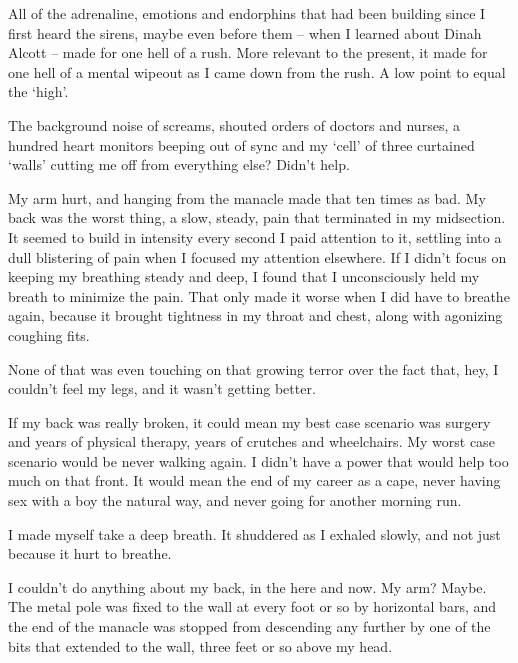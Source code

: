 All of the adrenaline, emotions and endorphins that had been building since I first heard the sirens, maybe even before them – when I learned about Dinah Alcott – made for one hell of a rush.  More relevant to the present, it made for one hell of a mental wipeout as I came down from the rush.  A low point to equal the `high'.



The background noise of screams, shouted orders of doctors and nurses, a hundred heart monitors beeping out of sync and my `cell' of three curtained `walls' cutting me off from everything else?   Didn't help.



My arm hurt, and hanging from the manacle made that ten times as bad.  My back was the worst thing, a slow, steady, pain that terminated in my midsection. It seemed to build in intensity every second I paid attention to it, settling into a dull blistering of pain when I focused my attention elsewhere.  If I didn't focus on keeping my breathing steady and deep, I found that I unconsciously held my breath to minimize the pain.  That only made it worse when I did have to breathe again, because it brought tightness in my throat and chest, along with agonizing coughing fits.



None of that was even touching on that growing terror over the fact that, hey, I couldn't feel my legs, and it wasn't getting better.



If my back was really broken, it could mean my best case scenario was surgery and years of physical therapy, years of crutches and wheelchairs.  My worst case scenario would be never walking again.  I didn't have a power that would help too much on that front.  It would mean the end of my career as a cape, never having sex with a boy the natural way, and never going for another morning run.



I made myself take a deep breath.  It shuddered as I exhaled slowly, and not just because it hurt to breathe.



I couldn't do anything about my back, in the here and now.  My arm?  Maybe.  The metal pole was fixed to the wall at every foot or so by horizontal bars, and the end of the manacle was stopped from descending any further by one of the bits that extended to the wall, three feet or so above my head.



